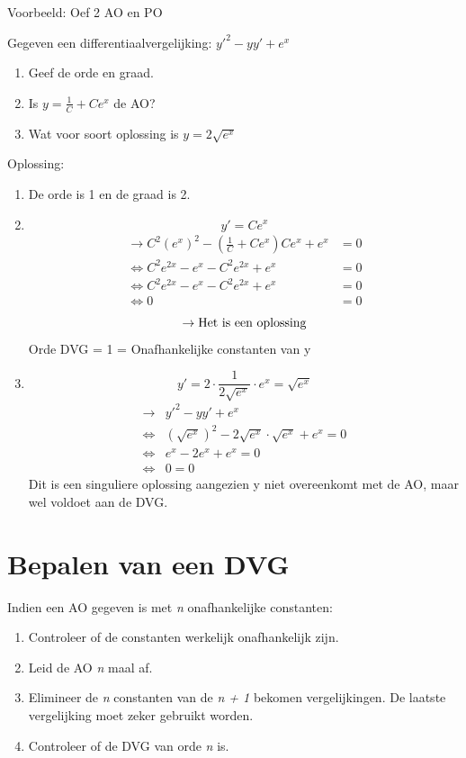 \documentclass[12pt]{report}
\newcommand{\example}[2]{
    \hrulefill
    
    Voorbeeld: #1
    
    #2
    
    \hrulefill
}
\begin{document}
\example{Oef 2 AO en PO}
{Gegeven een differentiaalvergelijking: $y'^2 - yy'+e^x$
\begin{enumerate}
\item Geef de orde en graad.
\item Is $y = \frac{1}{C} + Ce^x$ de AO?
\item Wat  voor soort oplossing is $y = 2\sqrt{e^x}$
\end{enumerate}
Oplossing:
\begin{enumerate}
\item 
De orde is 1 en de graad is 2.

\item 
$$y' = Ce^x$$
\begin{equation*}
\begin{split}
\rightarrow C^2(e^x)^2 - (\frac{1}{C} + Ce^x)Ce^x + e^x &  = 0 \\
\Leftrightarrow C^2e^{2x} - e^x - C^2e^{2x} + e^x &  = 0 \\
\Leftrightarrow C^2e^{2x} - e^x - C^2e^{2x} + e^x & = 0 \\
\Leftrightarrow 0 & =0
\end{split}
\end{equation*}
$$\rightarrow \hbox{Het is een oplossing}$$
Orde DVG = 1 = Onafhankelijke constanten van y

\item 
$$ y'  = 2 \cdot \frac{1}{2\sqrt{e^x}} \cdot e^x = \sqrt{e^x}$$
\begin{equation*}
\begin{split}
\rightarrow & y'^2 - yy'+e^x \\
\Leftrightarrow &  (\sqrt{e^x})^2 - 2\sqrt{e^x}\cdot\sqrt{e^x} + e^x  = 0 \\
\Leftrightarrow & e^x - 2e^x + e^x  = 0 \\
\Leftrightarrow & 0 = 0
\end{split}
\end{equation*}
Dit is een singuliere oplossing aangezien y niet overeenkomt met de AO, maar wel voldoet aan de DVG.

\end{enumerate}
}
\section{Bepalen van een DVG}
Indien een AO gegeven is met \textit{n} onafhankelijke constanten:
\begin{enumerate}
\item Controleer of de constanten werkelijk onafhankelijk zijn.
\item Leid de AO \textit{n} maal af.
\item Elimineer de \textit{n} constanten van de \textit{n + 1} bekomen vergelijkingen. De laatste vergelijking moet zeker gebruikt worden.
\item Controleer of de DVG van orde \textit{n} is.
\end{enumerate}
\end{document}
